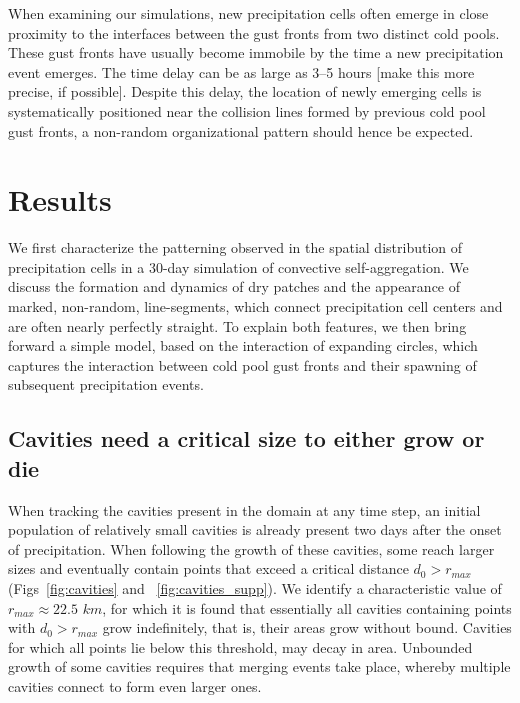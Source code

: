 \documentclass[reprint,amsmath,amssymb]{revtex4-1}
\begin{document}
When examining our simulations, new precipitation cells often emerge in close proximity to the interfaces between the gust fronts from two distinct cold pools.
These gust fronts have usually become immobile by the time a new precipitation event emerges.
The time delay can be as large as 3--5 hours {\color{red} [make this more precise, if possible]}.
Despite this delay, the location of newly emerging cells is systematically positioned near the collision lines formed by previous cold pool gust fronts, a non-random organizational pattern should hence be expected.

\section{Results}
We first characterize the patterning observed in the spatial distribution of precipitation cells in a 30-day simulation of convective self-aggregation.
We discuss the formation and dynamics of dry patches and the appearance of marked, non-random, line-segments, which connect precipitation cell centers and are often nearly perfectly straight.
To explain both features, we then bring forward a simple model, based on the interaction of expanding circles, which captures the interaction between cold pool gust fronts and their spawning of subsequent precipitation events.

\subsection{Cavities need a critical size to either grow or die}
When tracking the cavities present in the domain at any time step, an initial population of relatively small cavities is already present two days after the onset of precipitation.
When following the growth of these cavities, some reach larger sizes and eventually contain points that exceed a critical distance $d_0>r_{max}$ (Figs~\ref{fig:cavities} and ~\ref{fig:cavities_supp}).
We identify a characteristic value of $r_{max} \approx 22.5$ $km$, for which it is found that essentially all cavities containing points with $d_0>r_{max}$ grow indefinitely, that is, their areas grow without bound.
Cavities for which all points lie below this threshold, may decay in area.
Unbounded growth of some cavities requires that merging events take place, whereby multiple cavities connect to form even larger ones.
\end{document}
